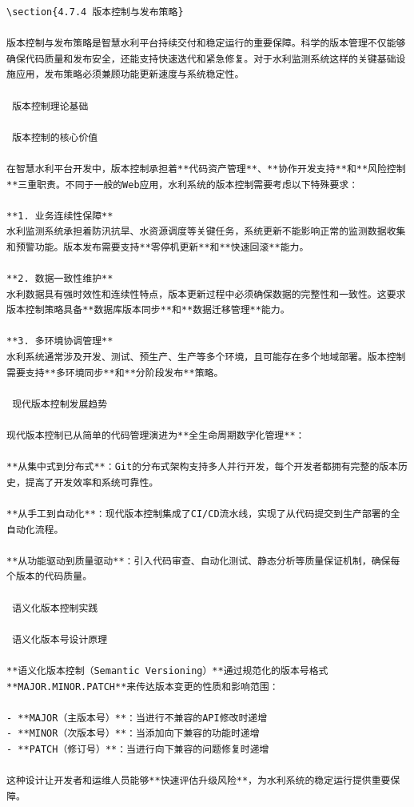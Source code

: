 {{\begin{lstlisting}
\section{4.7.4 版本控制与发布策略}

版本控制与发布策略是智慧水利平台持续交付和稳定运行的重要保障。科学的版本管理不仅能够确保代码质量和发布安全，还能支持快速迭代和紧急修复。对于水利监测系统这样的关键基础设施应用，发布策略必须兼顾功能更新速度与系统稳定性。

 版本控制理论基础

 版本控制的核心价值

在智慧水利平台开发中，版本控制承担着**代码资产管理**、**协作开发支持**和**风险控制**三重职责。不同于一般的Web应用，水利系统的版本控制需要考虑以下特殊要求：

**1. 业务连续性保障**
水利监测系统承担着防汛抗旱、水资源调度等关键任务，系统更新不能影响正常的监测数据收集和预警功能。版本发布需要支持**零停机更新**和**快速回滚**能力。

**2. 数据一致性维护**
水利数据具有强时效性和连续性特点，版本更新过程中必须确保数据的完整性和一致性。这要求版本控制策略具备**数据库版本同步**和**数据迁移管理**能力。

**3. 多环境协调管理**
水利系统通常涉及开发、测试、预生产、生产等多个环境，且可能存在多个地域部署。版本控制需要支持**多环境同步**和**分阶段发布**策略。

 现代版本控制发展趋势

现代版本控制已从简单的代码管理演进为**全生命周期数字化管理**：

**从集中式到分布式**：Git的分布式架构支持多人并行开发，每个开发者都拥有完整的版本历史，提高了开发效率和系统可靠性。

**从手工到自动化**：现代版本控制集成了CI/CD流水线，实现了从代码提交到生产部署的全自动化流程。

**从功能驱动到质量驱动**：引入代码审查、自动化测试、静态分析等质量保证机制，确保每个版本的代码质量。

 语义化版本控制实践

 语义化版本号设计原理

**语义化版本控制（Semantic Versioning）**通过规范化的版本号格式**MAJOR.MINOR.PATCH**来传达版本变更的性质和影响范围：

- **MAJOR（主版本号）**：当进行不兼容的API修改时递增
- **MINOR（次版本号）**：当添加向下兼容的功能时递增  
- **PATCH（修订号）**：当进行向下兼容的问题修复时递增

这种设计让开发者和运维人员能够**快速评估升级风险**，为水利系统的稳定运行提供重要保障。


\end{lstlisting}}}
